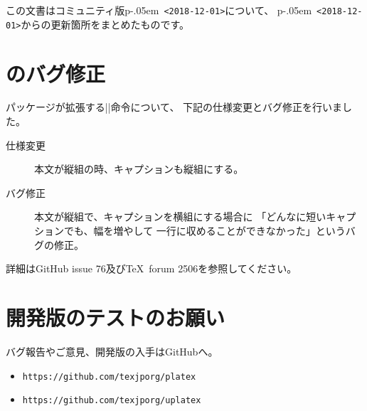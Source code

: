 \documentclass{plnews}
\author{日本語\TeX{}開発コミュニティ（\texttt{https://texjp.org/}）}
\def\pLaTeXe{p\kern-.05em\LaTeXe}
\begin{document}
\maketitle

この文書はコミュニティ版\pLaTeXe\ \texttt{<2018-12-01>}について、
\pLaTeXe\ \texttt{<2018-12-01>}からの更新箇所をまとめたものです。


\section{のバグ修正}
パッケージが拡張する|\pcaption|命令について、
下記の仕様変更とバグ修正を行いました。
\begin{description}
\item[仕様変更]
  本文が縦組の時、キャプションも縦組にする。
\item[バグ修正]
  本文が縦組で、キャプションを横組にする場合に
  「どんなに短いキャプションでも、幅を増やして
  一行に収めることができなかった」というバグの修正。
\end{description}
詳細はGitHub issue 76及び\TeX\ forum 2506を参照してください。


\section{開発版のテストのお願い}
バグ報告やご意見、開発版の入手はGitHubへ。
\begin{itemize}
\item \texttt{https://github.com/texjporg/platex}
\item \texttt{https://github.com/texjporg/uplatex}
\end{itemize}
\end{document}
